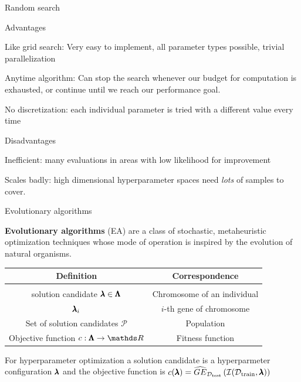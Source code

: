 \begin{frame}{Random search}
\framebreak

\begin{blocki}{Advantages}
\item Like grid search: Very easy to implement, all parameter types possible, trivial parallelization
\item Anytime algorithm: Can stop the search whenever our budget for computation is exhausted, or continue until we reach our performance goal.
\item No discretization: each individual parameter is tried with a different value every time
\end{blocki}

\begin{blocki}{Disadvantages}
\item Inefficient: many evaluations in areas with low likelihood for improvement
\item Scales badly: high dimensional hyperparameter spaces need \emph{lots} of samples to cover.
\end{blocki}
\end{frame}





\begin{frame}{Evolutionary algorithms}

\textbf{Evolutionary algorithms} (EA) are a class of stochastic, metaheuristic optimization techniques whose mode of operation is inspired by the evolution of natural organisms.

\vspace{0.5cm}

\begin{center}
\begin{tabular}{ c | c }
\textbf{Definition} & \textbf{Correspondence} \\[0.05cm]
\hline \\[0.01cm]
solution candidate $\pmb{\lambda} \in \pmb{\Lambda}$ & Chromosome of an individual \\[0.1cm]
$\pmb{\lambda}_{i}$& $i$-th gene of chromosome\\[0.1cm]
Set of solution candidates $\mathcal{P}$ & Population \\[0.1cm]
Objective function $\f: \XX \to \R$ & Fitness function
\end{tabular}
\end{center}

For hyperparameter optimization a solution candidate is a hyperparmeter configuration $\pmb{\lambda}$ and the objective function is $c(\pmb{\lambda}) = \widehat{GE}_{\mathcal{D}_{\text{test}}}\left(\mathcal{I}(\mathcal{D}_{\text{train}}, \pmb{\lambda})\right)$

\end{frame}

